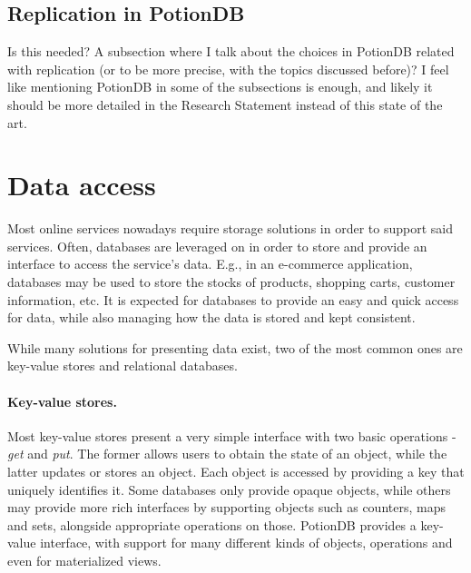 


\subsection{Replication in PotionDB}
Is this needed? A subsection where I talk about the choices in PotionDB related with replication (or to be more precise, with the topics discussed before)? I feel like mentioning PotionDB in some of the subsections is enough, and likely it should be more detailed in the Research Statement instead of this state of the art.


\section{Data access}

Most online services nowadays require storage solutions in order to support said services.
Often, databases are leveraged on in order to store and provide an interface to access the service's data.
E.g., in an e-commerce application, databases may be used to store the stocks of products, shopping carts, customer information, etc.
It is expected for databases to provide an easy and quick access for data, while also managing how the data is stored and kept consistent.

While many solutions for presenting data exist, two of the most common ones are key-value stores and relational databases.

\paragraph{Key-value stores.}
Most key-value stores present a very simple interface with two basic operations - \emph{get} and \emph{put}.
The former allows users to obtain the state of an object, while the latter updates or stores an object.
Each object is accessed by providing a key that uniquely identifies it.
Some databases only provide opaque objects, while others may provide more rich interfaces by supporting objects such as counters, maps and sets, alongside appropriate operations on those.
PotionDB provides a key-value interface, with support for many different kinds of objects, operations and even for materialized views.

